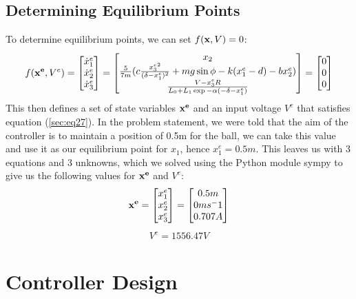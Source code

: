 \documentclass[a4paper,10pt,reqno]{amsart}
\numberwithin{equation}{section}
\begin{document}
\subsection{Determining Equilibrium Points} To determine equilibrium points, we can set $f(\bold x, V)=0$:
\begin{equation}
\label{sec:eq27}
    f(\bold{x^e}, V^e) = \begin{bmatrix} 
        \dot x_1^e \\ 
        \dot x_2^e \\ 
        \dot x_3^e 
    \end{bmatrix} = \begin{bmatrix}
        x_2 \\
        \frac{5}{7m}(c\frac{{x_3^e}^2}{(\delta-x_1^e)^2}+mg\sin{\phi}-k(x_1^e-d)-bx_2^e) \\
        \frac{V-x_3^eR}{L_0+L_1\exp{-\alpha(-\delta-x_1^e)}}
    \end{bmatrix} = \begin{bmatrix}
        0 \\
        0 \\
        0
    \end{bmatrix}
\end{equation}
This then defines a set of state variables $\bold{x^e}$ and an input voltage $V^e$ that satisfies equation (\ref{sec:eq27}). In the problem statement, we were told that the aim of the controller is to maintain a position of 0.5m for the ball, we can take this value and use it as our equilibrium point for $x_1$, hence $x_1^e=0.5m$. This leaves us with 3 equations and 3 unknowns, which we solved using the Python module sympy to give us the following values for $\bold{x^e}$ and $V^e$:
\begin{equation}
    \bold{x^e} = \begin{bmatrix}
        x_1^e \\
        x_2^e \\
        x_3^e
    \end{bmatrix} = \begin{bmatrix}
        0.5m \\
        0ms^-1 \\
        0.707A
    \end{bmatrix}
\end{equation}
\begin{align}
    V^e = 1556.47V
\end{align}
\section{Controller Design}
\end{document}
